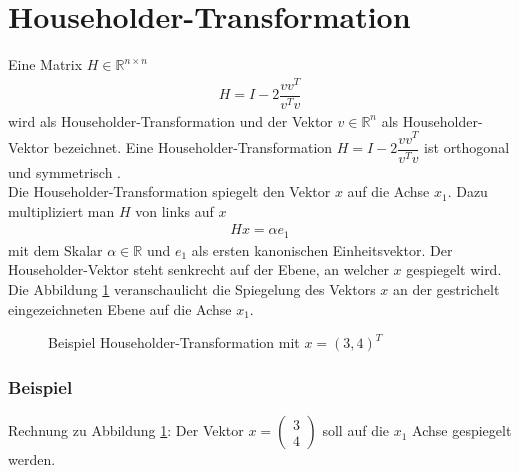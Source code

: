 \section{Householder-Transformation}
Eine Matrix $H \in \mathbb{R}^{n \times n}$ 
\begin{align}
H = I - 2 \dfrac{vv^T}{v^Tv} \label{eq:HHM}
\end{align}
wird als Householder-Transformation und der Vektor $v \in \mathbb{R}^n$ als Householder-Vektor bezeichnet.
Eine Householder-Transformation $H = I - 2 \dfrac{vv^T}{v^Tv}$ ist orthogonal und symmetrisch \cite{num1}.\\
Die Householder-Transformation spiegelt den Vektor $x$ auf die Achse $x_1$.
Dazu multipliziert man $H$ von links auf $x$
\begin{align}
Hx=\alpha e_1 \label{eq:spiegelung}
\end{align}
mit dem Skalar $\alpha \in \mathbb{R}$ und $e_1$ als ersten kanonischen Einheitsvektor. Der Householder-Vektor steht senkrecht auf der Ebene, an welcher $x$ gespiegelt wird.\\
Die Abbildung \ref{fig:HHolder} veranschaulicht die Spiegelung des Vektors $x$ an der gestrichelt eingezeichneten Ebene auf die Achse $x_1$.


\begin{figure}[H]
	\centering
	
	\caption{Beispiel Householder-Transformation mit $x=(3,4)^T$}
	\label{fig:HHolder}
\end{figure}
\newcommand{ \vecX }[2]{ \begin{pmatrix} #1\\#2 \end{pmatrix} }
\subsubsection{Beispiel}
Rechnung zu Abbildung \ref{fig:HHolder}: Der Vektor $x = \vecX{3}{4}$ soll auf die $x_1$ Achse gespiegelt werden.

